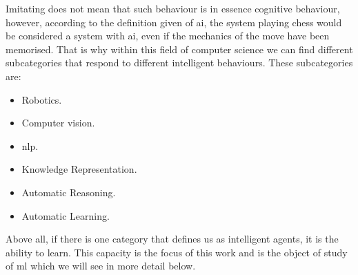 Imitating does not mean that such behaviour is in essence cognitive behaviour, however, according to the definition given of \acrshort{ai}, the system playing chess would be considered a system with \acrshort{ai}, even if the mechanics of the move have been memorised. That is why within this field of computer science we can find different subcategories that respond to different intelligent behaviours. These subcategories are:
\begin{itemize}
\item Robotics.
\item Computer vision.
\item \acrlong{nlp}.
\item Knowledge Representation.
\item Automatic Reasoning.
\item Automatic Learning.
\end{itemize}

Above all, if there is one category that defines us as intelligent agents, it is the ability to learn. This capacity is the focus of this work and is the object of study of \acrlong{ml} which we will see in more detail below.
\newline